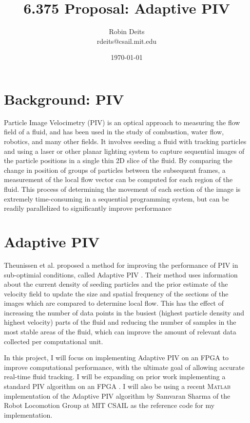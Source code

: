 \documentclass{article}
\begin{document}
	\author{Robin Deits\\ rdeits@csail.mit.edu}
	\title{6.375 Proposal: Adaptive PIV}
	\date{\today}
	\maketitle

	\section{Background: PIV} %
	\label{sec:background}
	Particle Image Velocimetry (PIV) is an optical approach to measuring the flow field of a fluid, and has been used in the study of combustion, water flow, robotics, and many other fields. It involves seeding a fluid with tracking particles and using a laser or other planar lighting system to capture sequential images of the particle positions in a single thin 2D slice of the fluid. By comparing the change in position of groups of particles between the subsequent frames, a measurement of the local flow vector can be computed for each region of the fluid. This process of determining the movement of each section of the image is extremely time-consuming in a sequential programming system, but can be readily parallelized to significantly improve performance \citep{Yu:2006tb}

	\section{Adaptive PIV} %
	\label{sec:adaptive_piv}
	Theunissen et al. proposed a method for improving the performance of PIV in sub-optimial conditions, called Adaptive PIV \citep{Theunissen:2009cr}. Their method uses information about the current density of seeding particles and the prior estimate of the velocity field to update the size and spatial frequency of the sections of the images which are compared to determine local flow. This has the effect of increasing the number of data points in the busiest (highest particle density and highest velocity) parts of the fluid and reducing the number of samples in the most stable areas of the fluid, which can improve the amount of relevant data collected per computational unit. 

	In this project, I will focus on implementing Adaptive PIV on an FPGA to improve computational performance, with the ultimate goal of allowing accurate real-time fluid tracking. I will be expanding on prior work implementing a standard PIV algorithm on an FPGA \citep{Yu:2006tb}. I will also be using a recent \textsc{Matlab} implementation of the Adaptive PIV algorithm by Samvaran Sharma of the Robot Locomotion Group at MIT CSAIL as the reference code for my implementation. 
\end{document}
